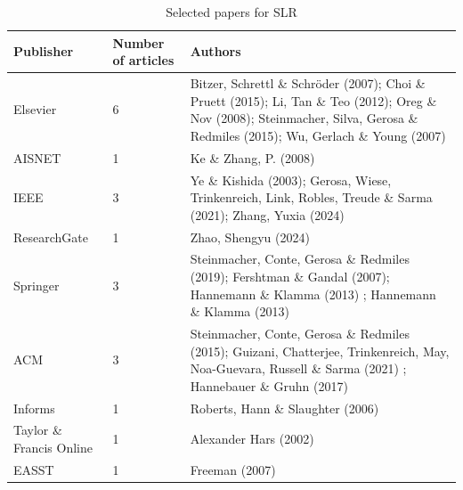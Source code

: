 \begin{table}[ht]
\begin{tabular}{| m{7em} | m{5em}| m{18em} | }
\hline
Publisher & Number of articles & Authors \\ \hline
Elsevier  &          6          &   Bitzer, Schrettl \& Schröder (2007); Choi \& Pruett (2015); Li, Tan \& Teo (2012); Oreg \& Nov (2008); Steinmacher, Silva, Gerosa \& Redmiles (2015); Wu, Gerlach \& Young (2007)   \\ \hline
     AISNET    &            1        &   Ke \& Zhang, P. (2008)       \\ \hline
     IEEE  &          3         &      Ye \& Kishida (2003); Gerosa, Wiese, Trinkenreich, Link, Robles, Treude \& Sarma (2021); Zhang, Yuxia (2024)   \\ \hline

     ResearchGate & 1 &  Zhao, Shengyu (2024)  \\ \hline
  
   Springer  &          3          &  Steinmacher, Conte, Gerosa \& Redmiles (2019); Fershtman \& Gandal  (2007); Hannemann \& Klamma (2013) ; Hannemann \& Klamma (2013)     \\ \hline

     ACM      &          3          &     Steinmacher, Conte, Gerosa \& Redmiles (2015); Guizani, Chatterjee, Trinkenreich, May, Noa-Guevara, Russell \& Sarma (2021) ; Hannebauer \& Gruhn (2017)    \\ \hline
     
        Informs  &          1          &   Roberts, Hann \& Slaughter (2006)      \\ \hline
Taylor \& Francis Online  &          1          &     Alexander Hars (2002)  \\ \hline

EASST & 1 &  Freeman (2007) \\ \hline
    

\end{tabular}
\caption{Selected papers for SLR}
\label{tab:databasePapers}
\end{table}


